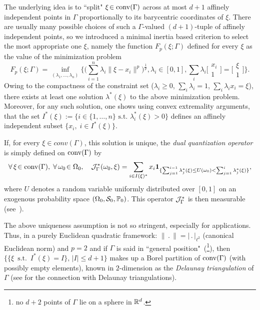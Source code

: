 \smallskip The underlying idea is to ``split" $\xi\!\in \operatorname{conv}(\Gamma)$ across at most $d+1$ affinely
independent points in $\Gamma$
proportionally to its barycentric coordinates of $\xi$. There are usually many possible choices of such a $\Gamma$-valued $(d+1)$-tuple of affinely independent points, so  we
introduced a minimal inertia based criterion to select the most appropriate
one  $\xi$, namely the function $F_p(\xi;\Gamma)$ defined for every
$\xi$ as the value of the minimization problem 
\begin{equation}
F_p(\xi;\Gamma)=\inf_{(\lambda_1,\ldots,\lambda_n)}\Big\{\Big(\sum_{i=1}^n
\lambda_i\|\xi-x_i\|^p\Big)^{\frac 1p}, \lambda_i\!\in[0,1] ,
\sum_i\lambda_i\Big[\!\begin{array}{c}x_i\\1\!\end{array}\Big]=\Big[\!\begin{array}{c}\xi\\1\end{array}\!\Big]\Big\}.
\end{equation}
Owing to the compactness of the constraint set ($\lambda_i\ge 0$,
$\sum_i\lambda_i =1$, $\sum_i \lambda_i x_i = \xi$), there exists at least one
solution $\lambda^*(\xi)$  to the above minimization problem. Moreover,  for any such solution,  one shows using convex
extremality arguments, that the set $I^*(\xi):=\big\{i\!\in\{1,\ldots,n\}\mbox{ s.t. } \lambda_i^*(\xi)>0\big\}$ defines an affinely independent subset $\{x_i,\; i\!\in I^*(\xi)\}$.

\smallskip
If, for every $\xi\!\in  conv(\Gamma)$, this solution is  unique, the {\em  dual quantization operator} is simply
defined on $\operatorname{conv}(\Gamma)$ by 
\begin{equation}\label{eq:Jstar}
\forall\, \xi\!\in \conv(\Gamma),\; \forall\,
\omega_0\!\in \Omega_0,\quad \mathcal{J}^*_{\Gamma}(\omega_0, \xi) = \sum_{i\in
I(\xi)^*}x_i \mbox{\bf 1}_{\{\sum_{j=1}^{i-1} \lambda^*_j(\xi)\le U(\omega_0)< 
\sum_{j=1}^{i} \lambda^*_j(\xi)\}},
\end{equation}
where $U$ denotes a  random variable  uniformly distributed over $[0,1]$ on an exogenous probability space  $(\Omega_0,\mathcal{S}_0,
\mathbb{P}_0)$. 
This operator ${\cal J}^*_{\Gamma}$ is then measurable
(see~\cite{dualStat}).

The above uniqueness assumption  is not so stringent, especially for applications.
Thus, in a purely Euclidean  quadratic framework:  $\|\,.\,\|= |\,.\,|_{\ell^2}$ (canonical Euclidean norm) and $p=2$  and if $\Gamma$ is said in  ``general position"~(\footnote{no $d+2$ points of $\Gamma$ lie on a sphere in $\mathbb{R}^d$.}), then $\displaystyle\Big\{\{\xi\, \mbox{ s.t. }\, I^*(\xi) =I\}, \, |I|\le d+1\Big\}$ makes up a Borel partition of
$\operatorname{conv}(\Gamma)$ (with possibly empty elements), known in $2$-dimension as the
{\em Delaunay triangulation} of $\Gamma$ (see \cite{rajan} for the connection
with  Delaunay triangulations). 


